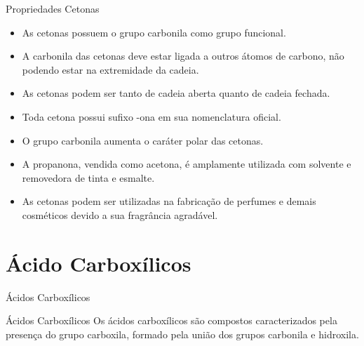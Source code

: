 \documentclass[presentation,professionalfonts,aspectratio=169]{beamer}
\begin{document}
\begin{frame}[label={sec:org9d5afbb}]{Propriedades Cetonas}
\begin{center}
\end{center}


\begin{itemize}
\item As cetonas possuem o grupo carbonila como grupo funcional.
\item A carbonila das cetonas deve estar ligada a outros átomos de carbono, não podendo estar na extremidade da cadeia.
\item As cetonas podem ser tanto de cadeia aberta quanto de cadeia fechada.
\item Toda cetona possui sufixo -ona em sua nomenclatura oficial.
\item O grupo carbonila aumenta o caráter polar das cetonas.
\item A propanona, vendida como acetona, é amplamente utilizada com solvente e removedora de tinta e esmalte.
\item As cetonas podem ser utilizadas na fabricação de perfumes e demais cosméticos devido a sua fragrância agradável.
\end{itemize}
\end{frame}




\section{Ácido Carboxílicos}
\label{sec:orgfad0c39}
\begin{frame}[label={sec:orgfdf971f}]{Ácidos Carboxílicos}
\begin{mybox}{Ácidos Carboxílicos}
Os ácidos carboxílicos são compostos caracterizados pela  presença do grupo \alert{carboxila}, formado pela união dos grupos carbonila e hidroxila.


\begin{center}
\end{center}
\end{mybox}
\end{frame}
\end{document}
